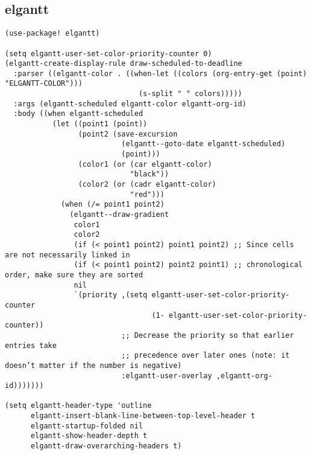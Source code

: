 \documentclass[11pt]{article}
\begin{document}
\subsection{elgantt}
\label{sec:org01849af}
\begin{verbatim}
(use-package! elgantt)

(setq elgantt-user-set-color-priority-counter 0)
(elgantt-create-display-rule draw-scheduled-to-deadline
  :parser ((elgantt-color . ((when-let ((colors (org-entry-get (point) "ELGANTT-COLOR")))
                               (s-split " " colors)))))
  :args (elgantt-scheduled elgantt-color elgantt-org-id)
  :body ((when elgantt-scheduled
           (let ((point1 (point))
                 (point2 (save-excursion
                           (elgantt--goto-date elgantt-scheduled)
                           (point)))
                 (color1 (or (car elgantt-color)
                             "black"))
                 (color2 (or (cadr elgantt-color)
                             "red")))
             (when (/= point1 point2)
               (elgantt--draw-gradient
                color1
                color2
                (if (< point1 point2) point1 point2) ;; Since cells are not necessarily linked in
                (if (< point1 point2) point2 point1) ;; chronological order, make sure they are sorted
                nil
                `(priority ,(setq elgantt-user-set-color-priority-counter
                                  (1- elgantt-user-set-color-priority-counter))
                           ;; Decrease the priority so that earlier entries take
                           ;; precedence over later ones (note: it doesn’t matter if the number is negative)
                           :elgantt-user-overlay ,elgantt-org-id)))))))

(setq elgantt-header-type 'outline
      elgantt-insert-blank-line-between-top-level-header t
      elgantt-startup-folded nil
      elgantt-show-header-depth t
      elgantt-draw-overarching-headers t)
\end{verbatim}
\end{document}
